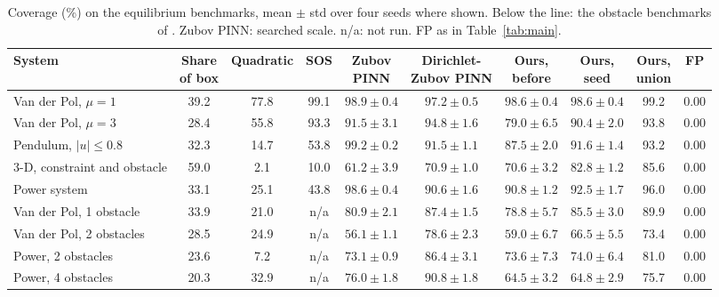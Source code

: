\begin{table}[t]
\centering\footnotesize\setlength{\tabcolsep}{2.5pt}
\caption{Coverage (\%) on the equilibrium benchmarks, mean $\pm$ std over four seeds where shown. Below the line: the obstacle benchmarks of \citet{mengliu2026}. Zubov PINN: searched scale. n/a: not run. FP as in Table~\ref{tab:main}.}
\label{tab:bench}
\begin{tabular}{@{}lccccccccc@{}}
\toprule
System & \shortstack{Share\\of box} & Quadratic & SOS & \shortstack{Zubov\\PINN} & \shortstack{Dirichlet-\\Zubov PINN} & \shortstack{Ours,\\before} & \shortstack{Ours,\\seed} & \shortstack{Ours,\\union} & FP\\
\midrule
Van der Pol, $\mu=1$ & 39.2 & 77.8 & 99.1 & $98.9\pm0.4$ & $97.2\pm0.5$ & $98.6\pm0.4$ & $98.6\pm0.4$ & 99.2 & 0.00\\
Van der Pol, $\mu=3$ & 28.4 & 55.8 & 93.3 & $91.5\pm3.1$ & $94.8\pm1.6$ & $79.0\pm6.5$ & $90.4\pm2.0$ & 93.8 & 0.00\\
Pendulum, $|u|\le0.8$ & 32.3 & 14.7 & 53.8 & $99.2\pm0.2$ & $91.5\pm1.1$ & $87.5\pm2.0$ & $91.6\pm1.4$ & 93.2 & 0.00\\
3-D, constraint and obstacle & 59.0 & 2.1 & 10.0 & $61.2\pm3.9$ & $70.9\pm1.0$ & $70.6\pm3.2$ & $82.8\pm1.2$ & 85.6 & 0.00\\
Power system & 33.1 & 25.1 & 43.8 & $98.6\pm0.4$ & $90.6\pm1.6$ & $90.8\pm1.2$ & $92.5\pm1.7$ & 96.0 & 0.00\\
\midrule
Van der Pol, 1 obstacle & 33.9 & 21.0 & n/a & $80.9\pm2.1$ & $87.4\pm1.5$ & $78.8\pm5.7$ & $85.5\pm3.0$ & 89.9 & 0.00\\
Van der Pol, 2 obstacles & 28.5 & 24.9 & n/a & $56.1\pm1.1$ & $78.6\pm2.3$ & $59.0\pm6.7$ & $66.5\pm5.5$ & 73.4 & 0.00\\
Power, 2 obstacles & 23.6 & 7.2 & n/a & $73.1\pm0.9$ & $86.4\pm3.1$ & $73.6\pm7.3$ & $74.0\pm6.4$ & 81.0 & 0.00\\
Power, 4 obstacles & 20.3 & 32.9 & n/a & $76.0\pm1.8$ & $90.8\pm1.8$ & $64.5\pm3.2$ & $64.8\pm2.9$ & 75.7 & 0.00\\
\bottomrule
\end{tabular}
\end{table}
